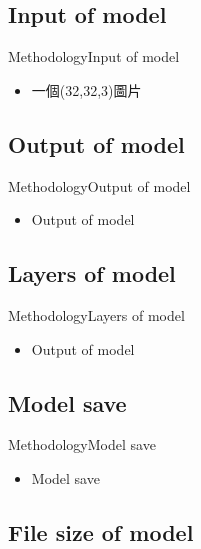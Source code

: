 \documentclass{beamer}
\begin{document}
\begin{CJK}{UTF8}{}
\subsection{Input of model}

\begin{frame}{Methodology}{Input of model}
	\begin{itemize}
	\item{
		一個(32,32,3)圖片
	}
	
	
	\end{itemize}
\end{frame}

\subsection{Output of model}

\begin{frame}{Methodology}{Output of model}
	\begin{itemize}
	\item{
		Output of model
	}
	\end{itemize}
\end{frame}

\subsection{Layers of model}

\begin{frame}{Methodology}{Layers of model}
	\begin{itemize}
	\item{
		Output of model
	}
	\end{itemize}
\end{frame}

\subsection{Model save}

\begin{frame}{Methodology}{Model save}
	\begin{itemize}
	\item{
		Model save
	}
	\end{itemize}
\end{frame}

\subsection{File size of model}


\end{CJK}
\end{document}
